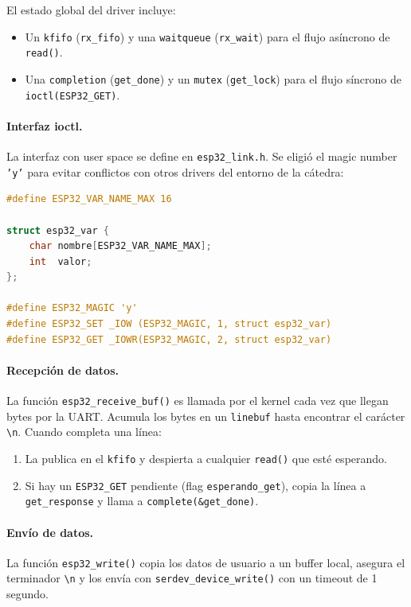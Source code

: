 \documentclass[RT]{UTNLSE}
\begin{document}
El estado global del driver incluye:
\begin{itemize}
    \item Un \texttt{kfifo} (\texttt{rx\_fifo}) y una \texttt{waitqueue} (\texttt{rx\_wait}) para el flujo asíncrono de \texttt{read()}.
    \item Una \texttt{completion} (\texttt{get\_done}) y un \texttt{mutex} (\texttt{get\_lock}) para el flujo síncrono de \texttt{ioctl(ESP32\_GET)}.
\end{itemize}

\paragraph{Interfaz ioctl.} La interfaz con user space se define en \texttt{esp32\_link.h}. Se eligió el magic number \texttt{'y'} para evitar conflictos con otros drivers del entorno de la cátedra:

\begin{lstlisting}[language=C, caption={Interfaz ioctl (extracto de esp32\_link.h)}]
#define ESP32_VAR_NAME_MAX 16

struct esp32_var {
    char nombre[ESP32_VAR_NAME_MAX];
    int  valor;
};

#define ESP32_MAGIC 'y'
#define ESP32_SET _IOW (ESP32_MAGIC, 1, struct esp32_var)
#define ESP32_GET _IOWR(ESP32_MAGIC, 2, struct esp32_var)
\end{lstlisting}

\paragraph{Recepción de datos.} La función \texttt{esp32\_receive\_buf()} es llamada por el kernel cada vez que llegan bytes por la UART. Acumula los bytes en un \texttt{linebuf} hasta encontrar el carácter \texttt{\textbackslash n}. Cuando completa una línea:

\begin{enumerate}
    \item La publica en el \texttt{kfifo} y despierta a cualquier \texttt{read()} que esté esperando.
    \item Si hay un \texttt{ESP32\_GET} pendiente (flag \texttt{esperando\_get}), copia la línea a \texttt{get\_response} y llama a \texttt{complete(\&get\_done)}.
\end{enumerate}

\paragraph{Envío de datos.} La función \texttt{esp32\_write()} copia los datos de usuario a un buffer local, asegura el terminador \texttt{\textbackslash n} y los envía con \texttt{serdev\_device\_write()} con un timeout de 1 segundo.
\end{document}
